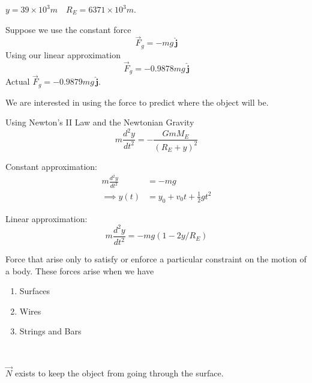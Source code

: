 \documentclass[twoside]{scrartcl}
\let\oldhat\hat
\renewcommand{\hat}[1]{\,\oldhat{\boldsymbol{\mathbf{#1}}}}
\begin{document}
\begin{example} $y = 39 \times 10^3m \quad R_E = 6371 \times 10^3m$.

Suppose we use the constant force 
\[\vec{F}_g = -mg\hat{j}\]
Using our linear approximation 
\[\vec{F}_g = -0.9878mg\hat{j}\]
Actual $\vec{F}_g = -0.9879mg\hat{j}$. 
\end{example}

We are interested in using the force to predict where the object will be.

Using Newton's II Law and the Newtonian Gravity
\[m\frac{d^2y}{dt^2} = -\frac{GmM_E}{(R_E + y)^2}\]

Constant approximation:
\[\begin{aligned}m\frac{d^2y}{dt^2} &= -mg\\
\implies y(t) &= y_0 + v_0t + \frac{1}{2}gt^2	
\end{aligned}
\]

Linear approximation:
\[m\frac{d^2y}{dt^2} = -mg(1-2y/R_E)\]



Force  that arise only to satisfy or enforce a particular constraint on the motion of a body. These forces arise when we have 
\begin{enumerate}
\item Surfaces
\item Wires
\item Strings and Bars	
\end{enumerate}~

\begin{example}
	\begin{center}
	\end{center}

$\vec{N}$ exists to keep the object from going through the surface.
\end{example}
\end{document}
